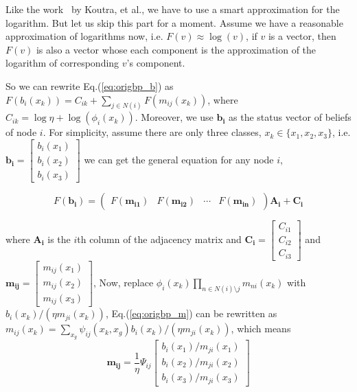 Like the work~\cite{KoutraKKCPF11} by Koutra, et al., we have to use a smart approximation for the logarithm. But let us skip this part for a moment. Assume we have a reasonable approximation of logarithms now, i.e. $F(v)\approx \log(v)$, if $v$ is a vector, then $F(v)$ is also a vector whose each component is the approximation of the logarithm of corresponding $v$'s component.

So we can rewrite Eq.(\ref{eq:origbp_b}) as $F(b_i(x_k))=C_{ik}+\mathop{\sum}_{j\in N(i)}F(m_{ij}(x_k))$, where $C_{ik}=\log\eta + \log(\phi_i(x_k))$. Moreover, we use $\mathbf{b_i}$ as the status vector of beliefs of node $i$. For simplicity, assume there are only three classes, $x_k\in \{x_1, x_2, x_3\}$, i.e. $\mathbf{b_i} = \left[ \begin{array}{c}
b_i(x_1) \\
b_i(x_2) \\
b_i(x_3) \end{array} \right]$ we can get the general equation for any node $i$,

\begin{equation}
F(\mathbf{b_i})=
\left( \begin{array}{cccc}
F(\mathbf{m_{i1}})&F(\mathbf{m_{i2}})&\cdots& F(\mathbf{m_{in}})\end{array} \right)\mathbf{A_i}+\mathbf{C_i}
\end{equation}

where $\mathbf{A_i}$ is the $i$th column of the adjacency matrix and $\mathbf{C_i} = \left[ \begin{array}{c}
C_{i1} \\
C_{i2} \\
C_{i3} \end{array} \right]$
and $\mathbf{m_{ij}} = \left[ \begin{array}{c}
m_{ij}(x_1) \\
m_{ij}(x_2) \\
m_{ij}(x_3) \end{array} \right]$, Now, replace $\phi_i(x_k)\prod_{n\in N(i)\setminus j} m_{ni}(x_k)$ with $b_i(x_k)/(\eta m_{ji}(x_k))$, Eq.(\ref{eq:origbp_m}) can be rewritten as $m_{ij}(x_k) = \sum_{x_g}\psi_{ij}(x_k,x_g)b_i(x_k)/(\eta m_{ji}(x_k))$, which means
\begin{equation}
\mathbf{m_{ij}} = \frac{1}{\eta} \Psi_{ij} \left[ \begin{array}{c}
b_i(x_1)/m_{ji}(x_1) \\
b_i(x_2)/m_{ji}(x_2) \\
b_i(x_3)/m_{ji}(x_3) \end{array} \right]
\end{equation}


